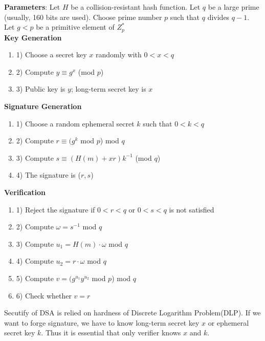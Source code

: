 \documentclass[a4paper]{article}
\begin{document}
\textbf{Parameters}: Let $H$ be a collision-resistant hash function. Let $q$ be a large prime (usually, 160 bits are used). Choose prime number $p$ such that $q$ divides $q-1$. Let $g<p$ be a primitive element of $Z_p^*$
\\

\textbf{Key Generation}
\begin{enumerate}[label=]
      \item 1) Choose a secret key $x$ randomly with $0<x<q$
      
      \item 2) Compute $y \equiv g^x$ (mod $p$)
      
      \item 3) Public key is $y$; long-term secret key is $x$
\end{enumerate}

\textbf{Signature Generation}
\begin{enumerate}[label=]
      \item 1) Choose a random ephemeral secret $k$ such that $0<k<q$
      
      \item 2) Compute $r \equiv (g^k$ mod $p$) mod $q$
      
      \item 3) Compute $s \equiv (H(m)+xr)k^{-1}$ (mod $q$)
      
      \item 4) The signature is ($r,s$)
\end{enumerate} 

\textbf{Verification}
\begin{enumerate}[label=]
      \item 1) Reject the signature if $0<r<q$ or $0<s<q$ is not satisfied
      \item 2) Compute $\omega = s^{-1}$ mod $q$
      \item 3) Compute $u_1 = H(m) \cdot \omega$ mod $q$
      \item 4) Compute $u_2 = r \cdot \omega$ mod $q$
      \item 5) Compute $v=(g^{u_1} y^{u_2}$ mod $p$) mod $q$
      \item 6) Check whether $v = r$
\end{enumerate} 

Secutify of DSA is relied on hardness of Discrete Logarithm Problem(DLP). If we want to forge signature, we have to know long-term secret key $x$ or ephemeral secret key $k$. Thus it is essential that only verifier knows $x$ and $k$.
\end{document}
